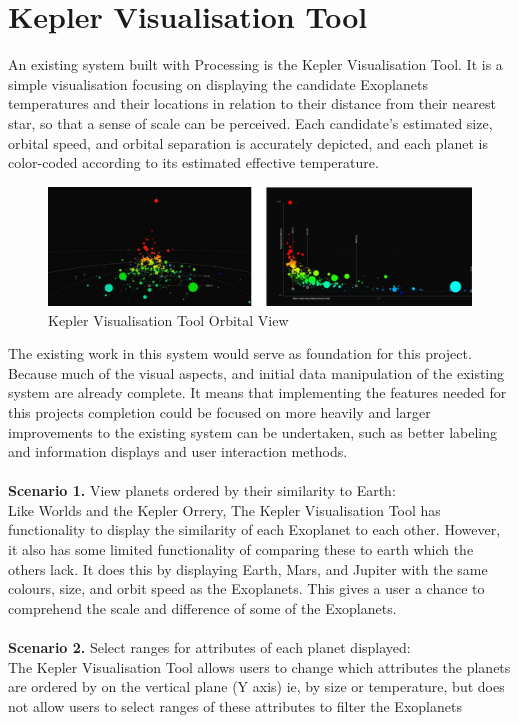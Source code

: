 \section{Kepler Visualisation Tool}
An existing system built with Processing is the Kepler Visualisation
Tool\cite{kepler_github, kepler_article}. It is a simple visualisation focusing
on displaying the candidate Exoplanets temperatures and their locations in
relation to their distance from their nearest star, so that a sense of scale can
be perceived. Each candidate’s estimated size, orbital speed, and orbital
separation is accurately depicted, and each planet is color-coded according to
its estimated effective temperature.
\begin{figure}[H]
  \centering
      \includegraphics[width=1\textwidth]{images/kepler.jpg}
  \caption{Kepler Visualisation Tool Orbital View}
\end{figure}

The existing work in this system would serve as foundation for this project.
Because much of the visual aspects, and initial data manipulation of the
existing system are already complete. It means that implementing the features
needed for this projects completion could be focused on more heavily and larger
improvements to the existing system can be undertaken, such as better labeling
and information displays and user interaction methods.
\\\\
{\bf Scenario 1.} View planets ordered by their similarity to Earth:\\
Like Worlds and the Kepler Orrery, The Kepler Visualisation Tool has
functionality to display the similarity of each Exoplanet to each other.
However, it also has some limited functionality of comparing these to earth
which the others lack. It does this by displaying Earth, Mars, and Jupiter with
the same colours, size, and orbit speed as the Exoplanets. This gives a user a
chance to comprehend the scale and difference of some of the Exoplanets.
\\\\
{\bf Scenario 2.} Select ranges for attributes of each planet displayed:\\
The Kepler Visualisation Tool allows users to change which attributes the
planets are ordered by on the vertical plane (Y axis) ie, by size or
temperature, but does not allow users to select ranges of these attributes to
filter the Exoplanets

